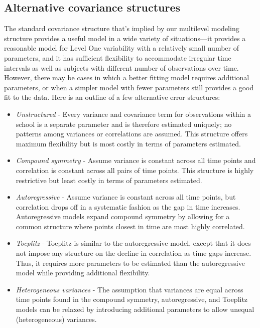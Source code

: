 \documentclass[
]{krantz}
\providecommand{\tightlist}{%
  \setlength{\itemsep}{0pt}\setlength{\parskip}{0pt}}
\begin{document}
\hypertarget{alternateerror}{%
\subsection{Alternative covariance structures}\label{alternateerror}}

The standard covariance structure that's implied by our multilevel modeling structure provides a useful model in a wide variety of situations---it provides a reasonable model for Level One variability with a relatively small number of parameters, and it has sufficient flexibility to accommodate irregular time intervals as well as subjects with different number of observations over time. However, there may be cases in which a better fitting model requires additional parameters, or when a simpler model with fewer parameters still provides a good fit to the data. Here is an outline of a few alternative error structures:

\begin{itemize}
\tightlist
\item
  \emph{Unstructured} - Every variance and covariance term for observations within a school is a separate parameter and is therefore estimated uniquely; no patterns among variances or correlations are assumed. This structure offers maximum flexibility but is most costly in terms of parameters estimated.
\item
  \emph{Compound symmetry} - Assume variance is constant across all time points and correlation is constant across all pairs of time points. This structure is highly restrictive but least costly in terms of parameters estimated.
\item
  \emph{Autoregressive} - Assume variance is constant across all time points, but correlation drops off in a systematic fashion as the gap in time increases. Autoregressive models expand compound symmetry by allowing for a common structure where points closest in time are most highly correlated.
\item
  \emph{Toeplitz} - Toeplitz is similar to the autoregressive model, except that it does not impose any structure on the decline in correlation as time gaps increase. Thus, it requires more parameters to be estimated than the autoregressive model while providing additional flexibility.
\item
  \emph{Heterogeneous variances} - The assumption that variances are equal across time points found in the compound symmetry, autoregressive, and Toeplitz models can be relaxed by introducing additional parameters to allow unequal (heterogeneous) variances.
\end{itemize}
\end{document}

